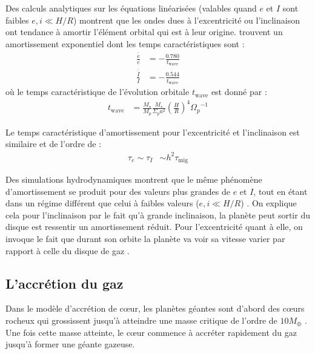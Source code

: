 Des calculs analytiques sur les équations linéarisées (valables quand $e$ et $I$ sont faibles $e,i \ll H/R$) montrent que les ondes dues à l'excentricité ou l'inclinaison ont tendance à amortir l'élément orbital qui est à leur origine. \cite[eqs. (45), (47)]{tanaka2004three} trouvent un amortissement exponentiel dont les temps caractéristiques sont : 
\begin{subequations}
\begin{align}
\frac{\overline{\dot{e}}}{e} &= -\frac{0.780}{t_\text{wave}}\\
\frac{\overline{\dot{I}}}{I} &= -\frac{0.544}{t_\text{wave}}
\end{align}
\end{subequations}
où le temps caractéristique de l'évolution orbitale $t_\text{wave}$ est donné par \cite[eq. (49)]{tanaka2004three} :
\begin{align}
t_\text{wave} &= \frac{M_\star}{M_p}\frac{M_\star}{\Sigma_p a^2} \left(\frac{H}{R}\right)^4 {\Omega_p}^{-1}
\end{align}

Le temps caractéristique d'amortissement pour l'excentricité et l'inclinaison est similaire et de l'ordre de \citep{tanaka2004three} :
\begin{align}
\tau_e \sim \tau_I &\sim h^2 \tau_\text{mig}
\end{align}

Des simulations hydrodynamiques montrent que le même phénomène d'amortissement se produit pour des valeurs plus grandes de $e$ et $I$, tout en étant dans un régime différent que celui à faibles valeurs ($e,i \ll H/R$) \citep{cresswell2007evolution}. On explique cela pour l'inclinaison par le fait qu'à grande inclinaison, la planète peut sortir du disque est ressentir un amortissement réduit. Pour l'excentricité quant à elle, on invoque le fait que durant son orbite la planète va voir sa vitesse varier par rapport à celle du disque de gaz \citep{papaloizou2000orbital}.

\subsection{L'accrétion du gaz}\label{sec:accretion_coeur}
Dans le modèle d'accrétion de cœur, les planètes géantes sont d'abord des cœurs rocheux qui grossissent jusqu'à atteindre une masse critique de l'ordre de $10 M_{\oplus}$ \citep{pollack1996formation}. Une fois cette masse atteinte, le cœur commence à accréter rapidement du gaz jusqu'à former une géante gazeuse.


